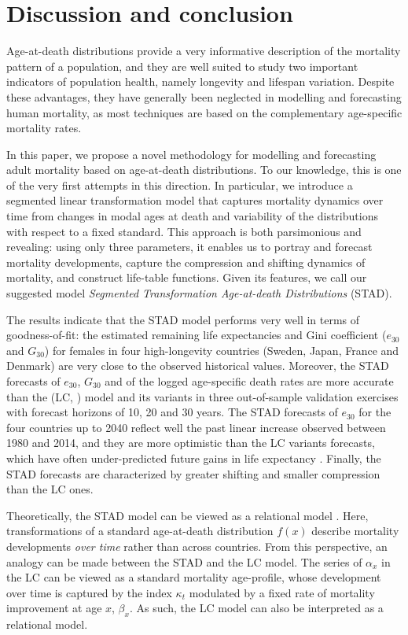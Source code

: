 \documentclass[Thesis]{subfiles}
\begin{document}
\section{Discussion and conclusion}\label{Sec:Ch3sec4}

Age-at-death distributions provide a very informative description of
the mortality pattern of a population, and they are well suited
to study two important indicators of population health, namely
longevity and lifespan variation. Despite these advantages, they have
generally been neglected in modelling and forecasting human mortality,
as most techniques are based on the complementary age-specific mortality rates. 

In this paper, we propose a novel methodology for modelling and
forecasting adult mortality based on age-at-death distributions. To our
knowledge, this is one of the very first attempts in this
direction. In particular, we introduce a segmented linear
transformation model that captures mortality dynamics over time from
changes in modal ages at death and variability of the distributions
with respect to a fixed standard. This approach is both parsimonious
and revealing: using only three parameters, it enables us to portray
and forecast mortality developments, capture the compression and
shifting dynamics of mortality, and construct life-table functions.     
Given its features, we call our suggested model \emph{Segmented
	Transformation Age-at-death Distributions} (STAD). 

The results indicate that the STAD model performs very well in terms of goodness-of-fit: the estimated remaining life expectancies and Gini coefficient ($e_{30}$ and $G_{30}$) for females in four high-longevity countries (Sweden, Japan, France and Denmark) are very close to the observed historical values. Moreover, the STAD forecasts of $e_{30}$, $G_{30}$ and of the logged age-specific death rates are more accurate than the \citeauthor{lee1992modeling} (LC, \citeyear{lee1992modeling}) model and its variants in three out-of-sample validation exercises with forecast horizons of 10, 20 and 30 years. The STAD forecasts of $e_{30}$ for the four countries up to 2040 reflect well the past linear increase observed between 1980 and 2014, and they are more optimistic than the LC variants forecasts, which have often under-predicted future gains in life expectancy \citep{lee2001evaluating}. Finally, the STAD forecasts are characterized by greater shifting and smaller compression than the LC ones.

Theoretically, the STAD model can be viewed as a relational model \citep{brass1971scale}. Here, transformations of a standard age-at-death
distribution $f(x)$ describe mortality developments \emph{over time}
rather than across countries. From this perspective, an analogy can be
made between the STAD and the LC model. The series of $\alpha_x$ in the LC can be viewed as a
standard mortality age-profile, whose development over time is
captured by the index $\kappa_t$ modulated by a fixed rate of mortality improvement at age $x$, $\beta_x$. As such, the LC model can also be interpreted as a relational model. 
\end{document}

